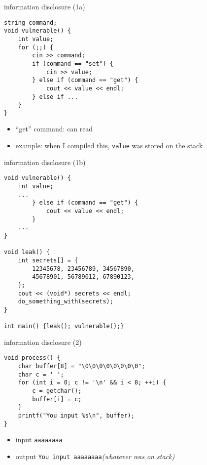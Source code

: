 \begin{frame}[fragile,label=infoDisc1a]{information disclosure (1a)}
\lstset{
    language=C++,
    style=small
}
\begin{lstlisting}
string command;
void vulnerable() {
    int value;
    for (;;) {
        cin >> command;
        if (command == "set") {
            cin >> value;
        } else if (command == "get") {
            cout << value << endl;
        } else if ...
    }
}
\end{lstlisting}
\begin{itemize}
\item ``get'' command: can read 
\item example: when I compiled this, \texttt{value} was stored on the stack
\end{itemize}
\end{frame}

\begin{frame}[fragile,label=infoDisc1b]{information disclosure (1b)}
\lstset{
    language=C++,
    style=small
}
\begin{lstlisting}
void vulnerable() {
    int value;
    ...
        } else if (command == "get") {
            cout << value << endl;
        }
    ...
}

void leak() {
    int secrets[] = { 
        12345678, 23456789, 34567890,
        45678901, 56789012, 67890123,
    };  
    cout << (void*) secrets << endl;
    do_something_with(secrets);
}

int main() {leak(); vulnerable();}
\end{lstlisting}
\end{frame}

\begin{frame}[fragile,label=infoDisc2]{information disclosure (2)}
\lstset{
    language=C,
    style=small
}
\begin{lstlisting}
void process() {
    char buffer[8] = "\0\0\0\0\0\0\0\0";
    char c = ' ';
    for (int i = 0; c != '\n' && i < 8; ++i) {
        c = getchar();
        buffer[i] = c;
    }
    printf("You input %s\n", buffer);
}
\end{lstlisting}
\begin{itemize}
\item input \verb|aaaaaaaa|
\item output \verb|You input aaaaaaaa|{\it (whatever was on stack)}
\end{itemize}
\end{frame}

